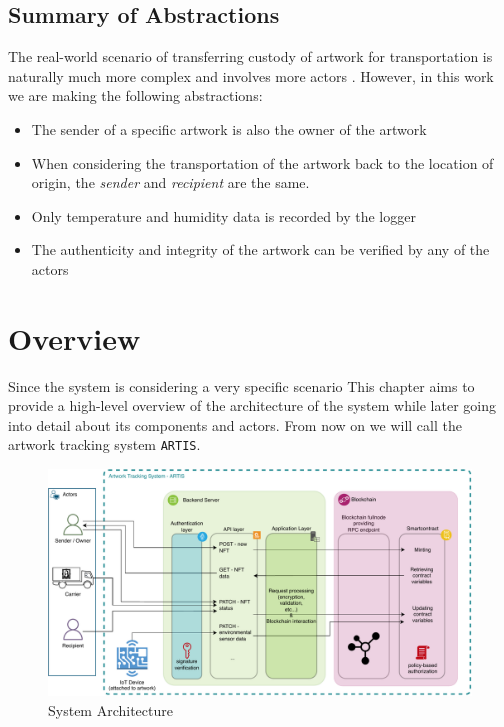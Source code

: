 \subsection*{Summary of Abstractions}
The real-world scenario of transferring custody of artwork for transportation is naturally much more complex and involves more actors \cite{artintransit}. However, in this work we are making the following abstractions:
\begin{itemize}
    \item The sender of a specific artwork is also the owner of the artwork
    \item When considering the transportation of the artwork back to the location of origin, the \textit{sender} and \textit{recipient} are the same.
    \item Only temperature and humidity data is recorded by the logger
    \item The authenticity and integrity of the artwork can be verified by any of the actors
\end{itemize}



\section{Overview}
\label{sec:overview}
Since the system is considering a very specific scenario This chapter aims to provide a high-level overview of the architecture of the system while later going into detail about its components and actors. From now on we will call the artwork tracking system \texttt{ARTIS}.

\begin{figure}[ht]
    \centering
    \includegraphics[width=\textwidth, keepaspectratio]{diagrams/Architecture.drawio.pdf}
    \caption{System Architecture}
    \label{fig:architecture}
\end{figure}

